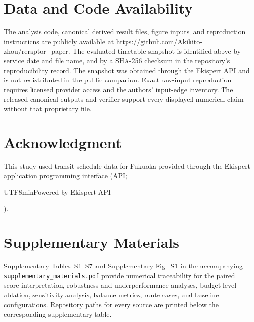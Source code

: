 \section*{Data and Code Availability}
The analysis code, canonical derived result files, figure inputs, and
reproduction instructions are publicly available at
\url{https://github.com/Akihito-zhou/reraptor_paper}.
The evaluated timetable snapshot is identified above by service date and file
name, and by a SHA-256 checksum in the repository's reproducibility record. The
snapshot was obtained through the Ekispert API and is not redistributed in the
public companion. Exact raw-input reproduction requires licensed provider
access and the authors' input-edge inventory. The released canonical outputs
and verifier support every displayed numerical claim without that proprietary
file.

\section*{Acknowledgment}
This study used transit schedule data for Fukuoka provided through the Ekispert
application programming interface (API;
\begin{CJK*}{UTF8}{min}Powered by Ekispert API\end{CJK*}).

\section*{Supplementary Materials}
Supplementary Tables~S1--S7 and Supplementary Fig.~S1 in the accompanying
\texttt{supplementary\_materials.pdf} provide numerical traceability for the
paired score interpretation, robustness and underperformance analyses,
budget-level ablation, sensitivity analysis, balance metrics, route cases, and
baseline configurations. Repository paths for every source are printed below
the corresponding supplementary table.

\begingroup
\renewcommand{\small}{\fontsize{8.2}{8.7}\selectfont}
\enlargethispage{6\baselineskip}


\endgroup


